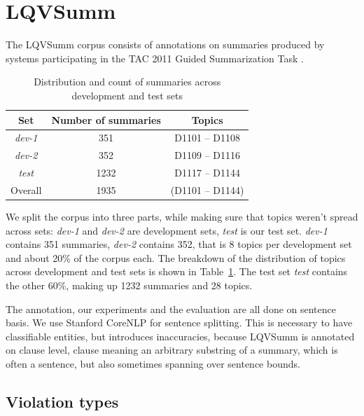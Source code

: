 \documentclass[a4paper,10pt]{scrartcl}
\theoremstyle{style}
\begin{document}
\section{LQVSumm}
\label{corpus_study}
The LQVSumm corpus consists of annotations on summaries produced by systems participating in the TAC 2011 Guided Summarization Task \citep{owczarzak2011overview}.

\begin{table}
\begin{center}
\begin{tabular}{|c|c|c|}
\hline
\textbf{Set} & \textbf{Number of summaries} & \textbf{Topics}\\
\hline
\textit{dev-1} & 351 & D1101 -- D1108\\
\hline
\textit{dev-2} & 352 & D1109 -- D1116\\
\hline
\textit{test} & 1232 & D1117 -- D1144\\
\hline\hline
Overall & 1935 & (D1101 -- D1144)\\
\hline
\end{tabular}
\end{center}
\label{testsets}
\caption{Distribution and count of summaries across development and test sets}
\end{table}

We split the corpus into three parts, while making sure that topics weren't spread across sets: \textit{dev-1} and \textit{dev-2} are development sets, \textit{test} is our test set.
\textit{dev-1} contains 351 summaries, \textit{dev-2} contains 352, that is 8 topics per development set and about 20\% of the corpus each. The breakdown of the distribution of topics across development and test sets is shown in Table~\ref{testsets}.
The test set \textit{test} contains the other 60\%, making up 1232 summaries and 28 topics.

The annotation, our experiments and the evaluation are all done on sentence basis. We use Stanford CoreNLP \citep{manning-EtAl:2014:P14-5} for sentence splitting. This is necessary to have classifiable entities, but introduces inaccuracies, because LQVSumm is annotated on clause level, clause meaning an arbitrary substring of a summary, which is often a sentence, but also sometimes spanning over sentence bounds.

\subsection{Violation types}
\end{document}
